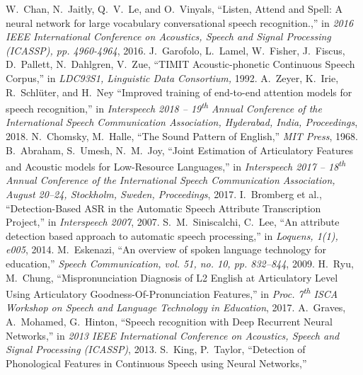 \documentclass[a4paper]{article}
\begin{document}


 \begin{thebibliography}{9}
   W.\ Chan, N.\ Jaitly, Q.\ V.\ Le, and O.\ Vinyals,
   ``Listen, Attend and Spell: A neural network for large vocabulary conversational speech recognition.,''
   in \textit{2016 IEEE International Conference on Acoustics, Speech and Signal Processing (ICASSP), pp. 4960-4964}, 2016.
   J.\ Garofolo, L.\ Lamel, W.\ Fisher, J.\ Fiscus, D.\ Pallett, N.\ Dahlgren, V.\ Zue,
   ``TIMIT Acoustic-phonetic Continuous Speech Corpus,''
   in \textit{LDC93S1, Linguistic Data Consortium,} 1992.
   A.\ Zeyer, K.\ Irie, R.\ Schlüter, and H.\ Ney
   ``Improved training of end-to-end attention models for speech recognition,''
   in \textit{Interspeech 2018 -- 19\textsuperscript{th} Annual Conference of the International Speech Communication Association, Hyderabad, India, Proceedings}, 2018.
   N.\ Chomsky, M.\ Halle,
   ``The Sound Pattern of English,''
   \textit{MIT Press}, 1968.
   B.\ Abraham, S.\ Umesh, N.\ M.\ Joy,
   ``Joint Estimation of Articulatory Features and Acoustic models for Low-Resource Languages,''
   in \textit{Interspeech 2017 -- 18\textsuperscript{th} Annual Conference of the International Speech Communication Association, August 20--24, Stockholm, Sweden, Proceedings}, 2017.
   I.\ Bromberg et al.,
   ``Detection-Based ASR in the Automatic Speech Attribute Transcription Project,''
   in \textit{Interspeech 2007}, 2007.
   S.\ M.\ Siniscalchi, C.\ Lee,
   ``An attribute detection based approach to automatic speech processing,''
   in \textit{Loquens, 1(1), e005}, 2014.
   M.\ Eskenazi,
   ``An overview of spoken language technology for education,''
   \textit{Speech Communication, vol. 51, no. 10, pp. 832–844}, 2009.
   H.\ Ryu, M.\ Chung,
   ``Mispronunciation Diagnosis of L2 English at Articulatory Level Using Articulatory Goodness-Of-Pronunciation Features,''
   in \textit{Proc. 7\textsuperscript{th} ISCA Workshop on Speech and Language Technology in Education}, 2017.
   A.\ Graves, A.\ Mohamed, G.\ Hinton,
   ``Speech recognition with Deep Recurrent Neural Networks,''
   in \textit{2013 IEEE International Conference on Acoustics, Speech and Signal Processing (ICASSP)}, 2013.
   S.\ King, P.\ Taylor,
   ``Detection of Phonological Features in Continuous Speech using Neural Networks,''

\end{thebibliography}
\end{document}
